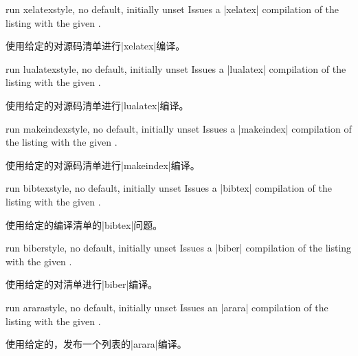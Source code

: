 \begin{docTcbKey}[][doc new=2014-11-14]{run xelatex}{}{style, no default, initially unset}
Issues a |xelatex| compilation of the listing with the given .

使用给定的对源码清单进行|xelatex|编译。
\end{docTcbKey}

\begin{docTcbKey}[][doc new=2014-11-14]{run lualatex}{}{style, no default, initially unset}
Issues a |lualatex| compilation of the listing with the given .

使用给定的对源码清单进行|lualatex|编译。
\end{docTcbKey}

\begin{docTcbKey}[][doc new=2014-11-14]{run makeindex}{}{style, no default, initially unset}
Issues a |makeindex| compilation of the listing with the given .

使用给定的对源码清单进行|makeindex|编译。
\end{docTcbKey}

\begin{docTcbKey}[][doc new=2014-11-14]{run bibtex}{}{style, no default, initially unset}
Issues a |bibtex| compilation of the listing with the given .

使用给定的编译清单的|bibtex|问题。
\end{docTcbKey}

\begin{docTcbKey}[][doc new=2014-11-14]{run biber}{}{style, no default, initially unset}
Issues a |biber| compilation of the listing with the given .

使用给定的对清单进行|biber|编译。
\end{docTcbKey}

\begin{docTcbKey}[][doc new=2014-11-14]{run arara}{}{style, no default, initially unset}
Issues an |arara| compilation of the listing with the given .

使用给定的，发布一个列表的|arara|编译。
\end{docTcbKey}

